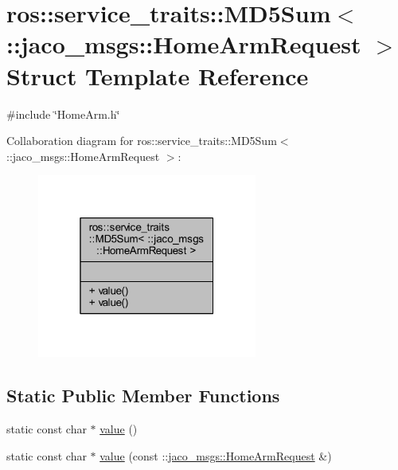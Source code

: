 \hypertarget{structros_1_1service__traits_1_1MD5Sum_3_01_1_1jaco__msgs_1_1HomeArmRequest_01_4}{}\section{ros\+:\+:service\+\_\+traits\+:\+:M\+D5\+Sum$<$ \+:\+:jaco\+\_\+msgs\+:\+:Home\+Arm\+Request $>$ Struct Template Reference}
\label{structros_1_1service__traits_1_1MD5Sum_3_01_1_1jaco__msgs_1_1HomeArmRequest_01_4}


{\ttfamily \#include \char`\"{}Home\+Arm.\+h\char`\"{}}



Collaboration diagram for ros\+:\+:service\+\_\+traits\+:\+:M\+D5\+Sum$<$ \+:\+:jaco\+\_\+msgs\+:\+:Home\+Arm\+Request $>$\+:
\nopagebreak
\begin{figure}[H]
\begin{center}
\leavevmode
\includegraphics[width=205pt]{d1/d7e/structros_1_1service__traits_1_1MD5Sum_3_01_1_1jaco__msgs_1_1HomeArmRequest_01_4__coll__graph}
\end{center}
\end{figure}
\subsection*{Static Public Member Functions}
\begin{DoxyCompactItemize}
\item 
static const char $\ast$ \hyperlink{structros_1_1service__traits_1_1MD5Sum_3_01_1_1jaco__msgs_1_1HomeArmRequest_01_4_a49e0ac95ee76a4f79e0ce4b1086545a0}{value} ()
\item 
static const char $\ast$ \hyperlink{structros_1_1service__traits_1_1MD5Sum_3_01_1_1jaco__msgs_1_1HomeArmRequest_01_4_a2b0aa86319fe7e0045d32928ea5ed184}{value} (const \+::\hyperlink{namespacejaco__msgs_a8c93ee6cb88452df5f0a3c5aec628121}{jaco\+\_\+msgs\+::\+Home\+Arm\+Request} \&)
\end{DoxyCompactItemize}



